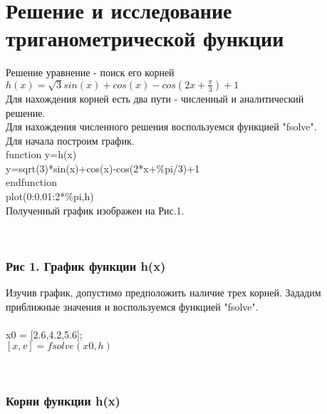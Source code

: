 \documentclass[russian,utf8,nocolumnxxxi,nocolumnxxxii]{eskdtext}
\begin{document}
\section{Решение и исследование триганометрической функции}
Решение уравнение - поиск его корней\\
$h(x)=\sqrt{3}sin(x)+cos(x)-cos(2x+\frac{\pi}{3})+1$\\
Для нахождения корней есть два пути - численный и аналитический\\
{ решение.}\\
Для нахождения численного решения воспользуемся функцией "fsolve".\\
Для начала построим график.\\
function y=h(x)\\
y=sqrt(3)*sin(x)+cos(x)-cos(2*x+\%pi/3)+1\\
endfunction\\
plot(0:0.01:2*\%pi,h)\\
Полученный график изображен на Рис.1.
\vspace{35mm}
\begin{center}
\begin{minipage}[h]{0.65\linewidth}
  \\
\frametitle{ Рис 1. График функции h(x)}
\end{minipage}
\end{center}

\newpage
Изучив график, допустимо предположить наличие трех корней. Зададим приближные значения и воспользуемся функцией "fsolve".\\
\\x0 = [2.6,4.2,5.6];
\\$[x,v] = fsolve(x0,h)$

\vspace{35mm}
\begin{center}
\begin{minipage}[h]{0.65\linewidth}
  \\
\frametitle{Корни функции h(x)}
\end{minipage}
\end{center}
\end{document}
